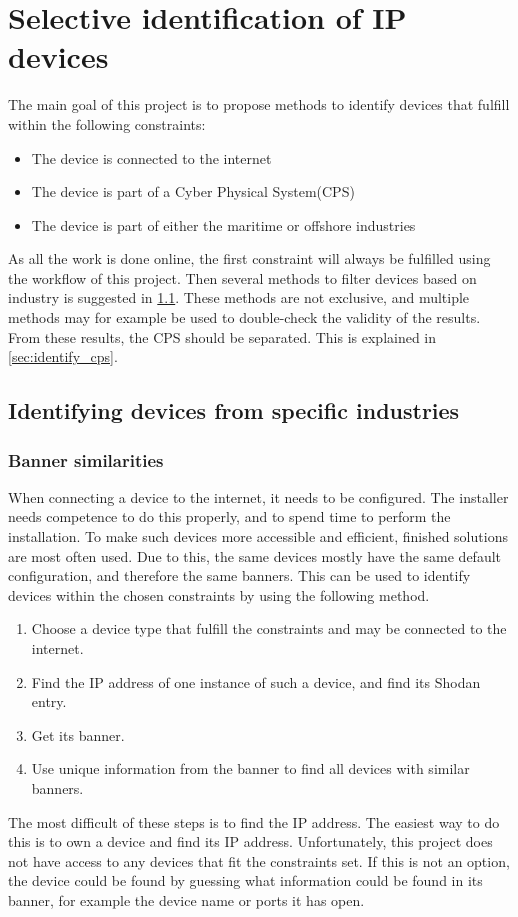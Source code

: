 \section{Selective identification of IP devices} \label{sec:method}
The main goal of this project is to propose methods to identify devices that fulfill within the following constraints:
\begin{itemize}
    \item The device is connected to the internet 
    \item The device is part of a Cyber Physical System(CPS)
    \item The device is part of either the maritime or offshore industries
\end{itemize}
As all the work is done online, the first constraint will always be fulfilled using the workflow of this project. 
Then several methods to filter devices based on industry is suggested in \cref{sec:identify_industry}. These methods are not exclusive, and multiple methods may for example be used to double-check the validity of the results.
From these results, the CPS should be separated. This is explained in \cref{sec:identify_cps}.

\subsection{Identifying devices from specific industries} \label{sec:identify_industry}
\subsubsection{Banner similarities} \label{sec:banner_method}
When connecting a device to the internet, it needs to be configured. The installer needs competence to do this properly, and to spend time to perform the installation. To make such devices more accessible and efficient, finished solutions are most often used. Due to this, the same devices mostly have the same default configuration, and therefore the same banners. This can be used to identify devices within the chosen constraints by using the following method.
\begin{enumerate}
    \item Choose a device type that fulfill the constraints and may be connected to the internet.
    \item Find the IP address of one instance of such a device, and find its Shodan entry.
    \item Get its banner.
    \item Use unique information from the banner to find all devices with similar banners.
\end{enumerate}
The most difficult of these steps is to find the IP address. The easiest way to do this is to own a device and find its IP address. Unfortunately, this project does not have access to any devices that fit the constraints set.
If this is not an option, the device could be found by guessing what information could be found in its banner, for example the device name or ports it has open.


